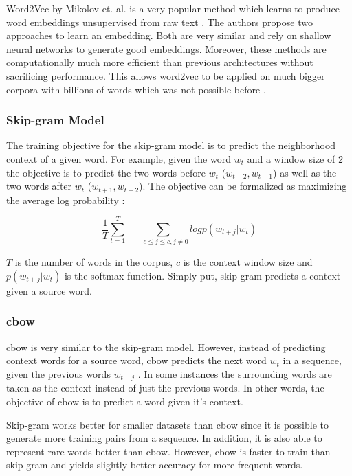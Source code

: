 Word2Vec by Mikolov et. al. is a very popular method which learns to produce word embeddings unsupervised from raw text \cite{Mikolov2013}. The authors propose two approaches to learn an embedding. Both are very similar and rely on shallow neural networks to generate good embeddings. Moreover, these methods are computationally much more efficient than previous architectures without sacrificing performance. This allows word2vec to be applied on much bigger corpora with billions of words which was not possible before \cite{Mikolov2013c}.


\subsubsection*{Skip-gram Model}

The training objective for the skip-gram model is to predict the neighborhood context of a given word. For example, given the word $w_t$ and a window size of 2 the objective is to predict the two words before $w_t$ {($w_{t-2}, w_{t-1}$)} as well as the two words after $w_t$ {($w_{t+1}, w_{t+2}$)}. The objective can be formalized as maximizing the average log probability \cite{Mikolov2013e}:

\begin{equation}
\frac{1}{T} \sum_{t=1}^T \quad \sum_{-c\leq j \leq c, j \neq 0} log p(w_{t+j} | w_t)
\end{equation}

$T$ is the number of words in the corpus, $c$ is the context window size and $p(w_{t+j} | w_t)$ is the softmax function. Simply put, skip-gram predicts a context given a source word.

\subsubsection*{\acrfull{cbow}}

\gls{cbow} is very similar to the skip-gram model. However, instead of predicting context words for a source word, \gls{cbow} predicts the next word $w_{t}$ in a sequence, given the previous words $w_{t-j}$ \cite{Mikolov2013c}. In some instances the surrounding words are taken as the context instead of just the previous words. In other words, the objective of \gls{cbow} is to predict a word given it's context.
\medskip

Skip-gram works better for smaller datasets than \gls{cbow} since it is possible to generate more training pairs from a sequence. In addition, it is also able to represent rare words better than \gls{cbow}. However, \gls{cbow} is faster to train than skip-gram and yields slightly better accuracy for more frequent words.

